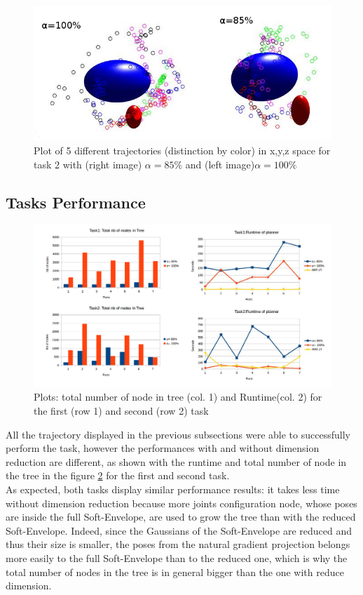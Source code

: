 \documentclass[letterpaper, 10 pt, conference]{ieeeconf}  %
\begin{document}
\begin{figure}[h]
	\centering
	\includegraphics[scale=0.38]{figure/gaussianTask2.jpg}
	\caption{Plot of 5 different trajectories (distinction by color) in x,y,z space for task 2 with (right image) $\alpha = 85\%$ and (left image)$\alpha = 100\%$ }
	\label{task2ModelGaussian}
\end{figure}
\subsection{Tasks Performance}
\begin{figure}[h]
	\centering
	\includegraphics[scale=0.27]{figure/RunTimeAndNbNodeTask1_2.png}
	\caption{Plots: total number of node in tree (col. 1) and Runtime(col. 2) for the first (row 1) and second (row 2) task }
	\label{plotGraphAll}
\end{figure}
All the trajectory displayed in the previous subsections were able to successfully  perform the task, however the performances with and without dimension reduction are different, as shown with the runtime and total number of node in the tree in the figure \ref{plotGraphAll} for the first and second task. \\

As expected, both tasks display similar performance results: it takes less time without dimension reduction because more joints configuration node, whose poses are inside the full Soft-Envelope, are used to grow the tree than with the reduced Soft-Envelope. Indeed, since the Gaussians of the Soft-Envelope are reduced and thus their size is smaller, the poses from the natural gradient projection belongs more easily to the full Soft-Envelope than to the reduced one, which is why the total number of nodes in the tree is in general bigger than the one with reduce dimension.\\
\end{document}
